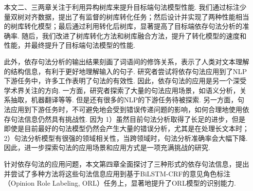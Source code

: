 本文二、三两章关注于利用异构树库来提升目标端句法模型性能. 我们通过标注少量双树对齐数据，提出了有监督的树库转化任务；然后设计并实现了两种性能相当的树库转化模型；最后通过利用转化后树库，显著提高了目标端依存句法分析的准确率. 随后，我们改进了树库转化方法和树库融合方法，提升了转化模型的速度和性能，并最终提升了目标端句法模型的性能.

此外，依存句法分析的输出结果刻画了词语间的修饰关系，表示了人类对文本理解的结构信息，有利于更好地理解输入的句子.
研究者尝试将依存句法应用到了NLP下游任务中，许多工作表明了句法的有效性.
因此，依存句法的应用是另一个深受学术界关注的方向.
一方面，研究者探索了大量的句法应用场景，如语义分析，关系抽取，机器翻译等等. 但是还有很多的NLP的下游任务待被探索.
另一方面，句法应用到下游任务时，不可避免地会受到错误传递问题的影响，如何合理地使用依存句法信息仍然具有挑战性.
因为 1）虽然目前句法分析取得了长足的进步，但是即使是目前最好的句法模型仍然会产生大量的错误分析，尤其是在处理长文本时；
2）句法分析模型有很强的领域相关性，当跨领域时，句法分析准确率会大幅下降.
因此，进一步探索句法的应用场景和应用方式是一项充满挑战的研究.

针对依存句法的应用问题，本文第四章全面探讨了三种形式的依存句法信息，提出并尝试了多种方法将这些句法信息应用到基于BiLSTM-CRF的意见角色标注（Opinion Role Labeling, ORL）任务上，显著地提升了ORL模型的识别能力.


